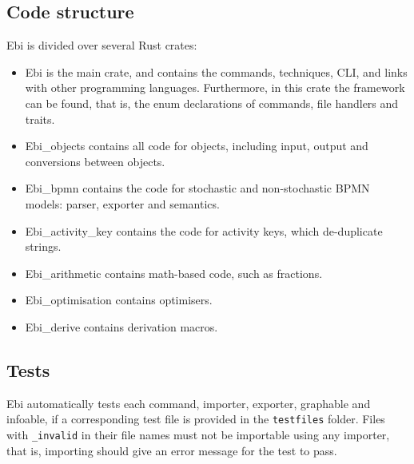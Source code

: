 \documentclass{book}
\begin{document}
        \subsection{Code structure}
            Ebi is divided over several Rust crates:
            \begin{itemize}
                \item Ebi is the main crate, and contains the commands, techniques, CLI, and links with other programming languages.
                Furthermore, in this crate the framework can be found, that is, the enum declarations of commands, file handlers and traits.
                \item Ebi\_objects contains all code for objects, including input, output and conversions between objects.
                \item Ebi\_bpmn contains the code for stochastic and non-stochastic BPMN models: parser, exporter and semantics.
                \item Ebi\_activity\_key contains the code for activity keys, which de-duplicate strings.
                \item Ebi\_arithmetic contains math-based code, such as fractions.
                \item Ebi\_optimisation contains optimisers.
                \item Ebi\_derive contains derivation macros.
            \end{itemize}

        \subsection{Tests}
        \label{sec:tests}
            Ebi automatically tests each command, importer, exporter, graphable and infoable, if a corresponding test file is provided in the \verb=testfiles= folder.
            Files with \verb=_invalid= in their file names must not be importable using any importer, that is, importing should give an error message for the test to pass.
\end{document}
